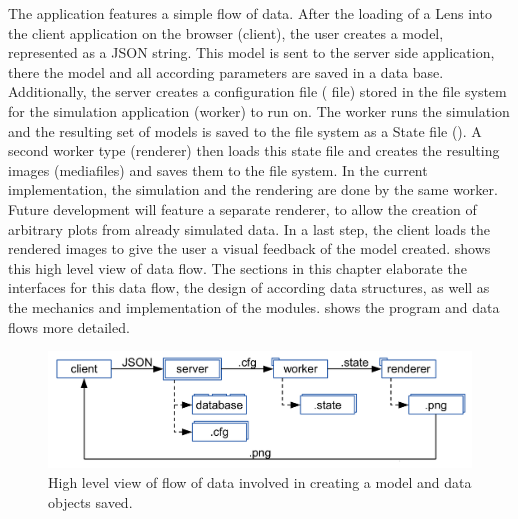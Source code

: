 The application features a simple flow of data.
After the loading of a Lens into the client application on the browser (client), the user creates a model, represented as a JSON string.
This model is sent to the server side application, there the model and all according parameters are saved in a data base.
Additionally, the server creates a configuration file ( file) stored in the file system for the simulation application (worker) to run on.
The worker runs the simulation and the resulting set of models is saved to the file system as a State file ().
A second worker type (renderer) then loads this state file and creates the resulting images (mediafiles) and saves them to the file system.
In the current implementation, the simulation and the rendering are done by the same worker.
Future development will feature a separate renderer, to allow the creation of arbitrary plots from already simulated data.
In a last step, the client loads the rendered images to give the user a visual feedback of the model created.
 shows this high level view of data flow.
The sections in this chapter elaborate the interfaces for this data flow, the design of according data structures, as well as the mechanics and implementation of the modules.
 shows the program and data flows more detailed.

\begin{figure}[htbp]
  \centering
    \includegraphics[width=\figwidth]{fig/dataflow.pdf}
  \caption{High level view of flow of data involved in creating a model and data objects saved.}
  \label{fig:dataflow}
\end{figure}



